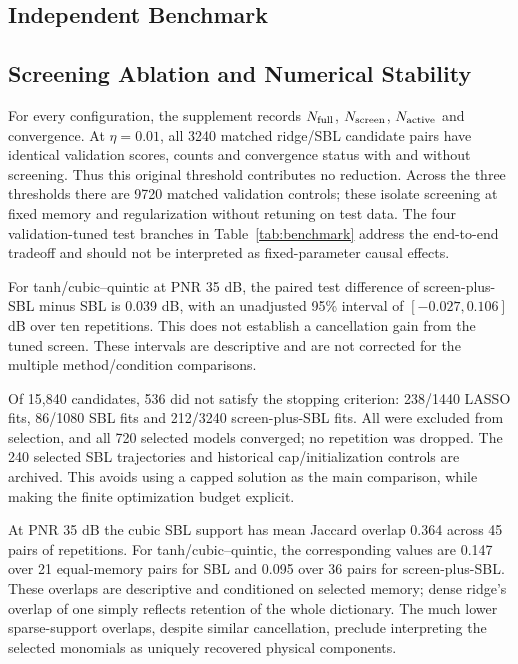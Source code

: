 \documentclass[conference]{IEEEtran}
\begin{document}
\subsection{Independent Benchmark}


\subsection{Screening Ablation and Numerical Stability}
For every configuration, the supplement records $N_{\rm full}$, $N_{\rm screen}$, $N_{\rm active}$ and convergence. At $\eta=0.01$, all 3240 matched ridge/SBL candidate pairs have identical validation scores, counts and convergence status with and without screening. Thus this original threshold contributes no reduction. Across the three thresholds there are 9720 matched validation controls; these isolate screening at fixed memory and regularization without retuning on test data. The four validation-tuned test branches in Table~\ref{tab:benchmark} address the end-to-end tradeoff and should not be interpreted as fixed-parameter causal effects.

For tanh/cubic--quintic at PNR 35 dB, the paired test difference of screen-plus-SBL minus SBL is 0.039 dB, with an unadjusted 95\% interval of $[-0.027,0.106]$ dB over ten repetitions. This does not establish a cancellation gain from the tuned screen. These intervals are descriptive and are not corrected for the multiple method/condition comparisons.

Of 15,840 candidates, 536 did not satisfy the stopping criterion: 238/1440 LASSO fits, 86/1080 SBL fits and 212/3240 screen-plus-SBL fits. All were excluded from selection, and all 720 selected models converged; no repetition was dropped. The 240 selected SBL trajectories and historical cap/initialization controls are archived. This avoids using a capped solution as the main comparison, while making the finite optimization budget explicit.

At PNR 35 dB the cubic SBL support has mean Jaccard overlap 0.364 across 45 pairs of repetitions. For tanh/cubic--quintic, the corresponding values are 0.147 over 21 equal-memory pairs for SBL and 0.095 over 36 pairs for screen-plus-SBL. These overlaps are descriptive and conditioned on selected memory; dense ridge's overlap of one simply reflects retention of the whole dictionary. The much lower sparse-support overlaps, despite similar cancellation, preclude interpreting the selected monomials as uniquely recovered physical components.
\end{document}
